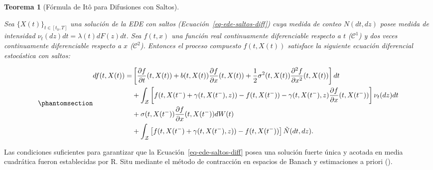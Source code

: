 \documentclass[
  spanish,
  us-letterpaper,
]{scrreprt}
\numberwithin{equation}{section}
\theoremstyle{plain}
\newtheorem{theorem}{Teorema}[chapter]
\theoremstyle{plain}
\theoremstyle{plain}
\theoremstyle{definition}
\theoremstyle{remark}
\begin{document}
\begin{theorem}[Fórmula de Itô para Difusiones con
Saltos]\protect\hypertarget{thm-ito-saltos-fijo}{}\label{thm-ito-saltos-fijo}

Sea \(\{X(t)\}_{t \in [t_0, T]}\) una solución de la EDE con saltos
(Ecuación~\ref{eq-ede-saltos-diff}) cuya medida de conteo \(N(dt, dz)\)
posee medida de intensidad \(\nu_t(dz)dt = \lambda(t)dF(z)dt\). Sea
\(f(t, x)\) una función real continuamente diferenciable respecto a
\(t\) (\(\mathcal{C}^1\)) y dos veces continuamente diferenciable
respecto a \(x\) (\(\mathcal{C}^2\)). Entonces el proceso compuesto
\(f(t, X(t))\) satisface la siguiente ecuación diferencial estocástica
con saltos:

\begin{equation}\phantomsection\label{eq-ito-saltos-fijo}{
\begin{aligned}
df(t, X(t)) = & \left[ \frac{\partial f}{\partial t}(t, X(t)) + b(t, X(t))\frac{\partial f}{\partial x}(t, X(t)) + \frac{1}{2}\sigma^2(t, X(t))\frac{\partial^2 f}{\partial x^2}(t, X(t)) \right] dt \\
& + \int_{\mathcal{Z}} \left[ f(t, X(t^-) + \gamma(t, X(t^-), z)) - f(t, X(t^-)) - \gamma(t, X(t^-), z)\frac{\partial f}{\partial x}(t, X(t^-)) \right] \nu_t(dz) dt \\
& + \sigma(t, X(t^-))\frac{\partial f}{\partial x}(t, X(t^-)) dW(t) \\
& + \int_{\mathcal{Z}} \left[ f(t, X(t^-) + \gamma(t, X(t^-), z)) - f(t, X(t^-)) \right] \tilde{N}(dt, dz).
\end{aligned}
}\end{equation}

\end{theorem}

Las condiciones suficientes para garantizar que la
Ecuación~\ref{eq-ede-saltos-diff} posea una solución fuerte única y
acotada en media cuadrática fueron establecidas por R. Situ mediante el
método de contracción en espacios de Banach y estimaciones a priori
().
\end{document}
